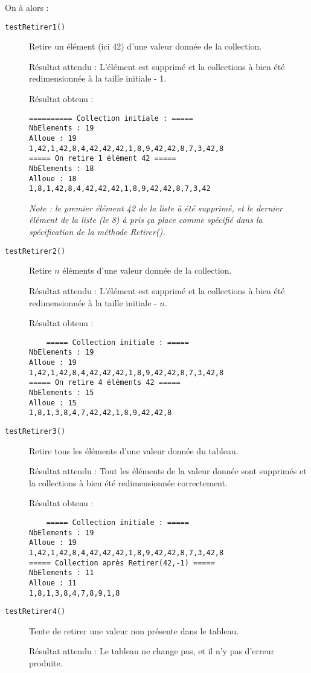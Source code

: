 \documentclass[10pt]{article}
\begin{document}
On à alors :
\begin{description}
	\item[\texttt{testRetirer1()}] Retire un élément (ici 42) d'une valeur donnée de la collection.
	
	Résultat attendu : L'élément est supprimé et la collections à bien été redimensionnée à la taille initiale - 1.
	
	Résultat obtenu :
	\begin{verbatim}
========== Collection initiale : =====
NbElements : 19
Alloue : 19
1,42,1,42,8,4,42,42,42,1,8,9,42,42,8,7,3,42,8
===== On retire 1 élément 42 =====
NbElements : 18
Alloue : 18
1,8,1,42,8,4,42,42,42,1,8,9,42,42,8,7,3,42
\end{verbatim}
	\emph{Note : le premier élément 42 de la liste à été supprimé, et le dernier élément de la liste (le 8) à pris ça place comme spécifié dans la spécification de la méthode Retirer().}
	
	\item[\texttt{testRetirer2()}] Retire $n$ éléments d'une valeur donnée de la collection.
	
	Résultat attendu : L'élément est supprimé et la collections à bien été redimensionnée à la taille initiale - $n$.
	
	Résultat obtenu : 
	\begin{verbatim}
	===== Collection initiale : =====
NbElements : 19
Alloue : 19
1,42,1,42,8,4,42,42,42,1,8,9,42,42,8,7,3,42,8
===== On retire 4 éléments 42 =====
NbElements : 15
Alloue : 15
1,8,1,3,8,4,7,42,42,1,8,9,42,42,8
\end{verbatim}
	
	\item[\texttt{testRetirer3()}] Retire tous les éléments d'une valeur donnée du tableau.
	
	Résultat attendu : Tout les éléments de la valeur donnée sont supprimés et la collections à bien été redimensionnée correctement.
	
	Résultat obtenu :
	\begin{verbatim}
	===== Collection initiale : =====
NbElements : 19
Alloue : 19
1,42,1,42,8,4,42,42,42,1,8,9,42,42,8,7,3,42,8
===== Collection après Retirer(42,-1) =====
NbElements : 11
Alloue : 11
1,8,1,3,8,4,7,8,9,1,8
\end{verbatim}
	
	\item[\texttt{testRetirer4()}] Tente de retirer une valeur non présente dans le tableau.
	
	Résultat attendu : Le tableau ne change pas, et il n'y pas d'erreur produite.
	

\end{description}
\end{document}
